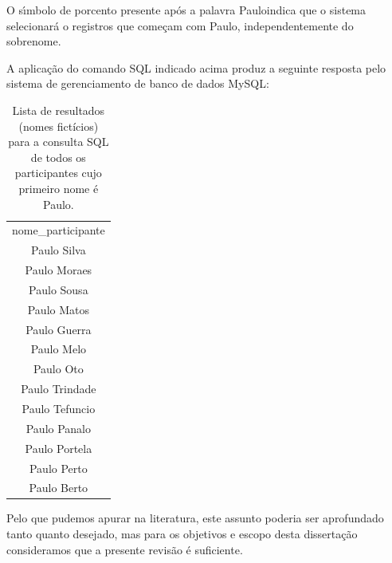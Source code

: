 \documentclass[
12pt,		%
openright,	%
twoside,  %
a4paper,			%
chapter=TITLE,		%
english,			%
french,				%
spanish,			%
brazil				%
]{USPSC-classe/USPSC}
\begin{document}
O s\'{\i}mbolo de porcento presente ap\'os a palavra \textquotedbl Paulo\textquotedbl  indica que o sistema selecionar\'a o registros que come\c{c}am com \textquotedbl Paulo\textquotedbl , independentemente do sobrenome.

















A aplica\c{c}\~ao do comando SQL indicado acima produz a seguinte resposta pelo sistema de gerenciamento de banco de dados MySQL:





















\begin{table}[htb]
\tiny
\caption{\label{fe3cd6334e1b9072eda70730e1734e26869d9c57}Lista de resultados (nomes fict\'{i}cios) para a consulta SQL de todos os participantes cujo primeiro nome \'e Paulo.}

\centering
\begin{tabular}{|c|}
\hline
nome\_participante        \\
Paulo Silva              \\
Paulo Moraes \\
Paulo Sousa \\
Paulo Matos \\
Paulo Guerra \\
Paulo Melo \\
Paulo Oto \\
Paulo Trindade \\
Paulo Tefuncio \\
Paulo Panalo \\
Paulo Portela \\
Paulo Perto \\
Paulo Berto \\
\hline
\end{tabular}
\end{table}


Pelo que pudemos apurar na literatura, este assunto poderia ser aprofundado tanto quanto desejado, mas para os objetivos e escopo desta disserta\c{c}\~ao consideramos que a presente revis\~ao \'e suficiente.
\end{document}
